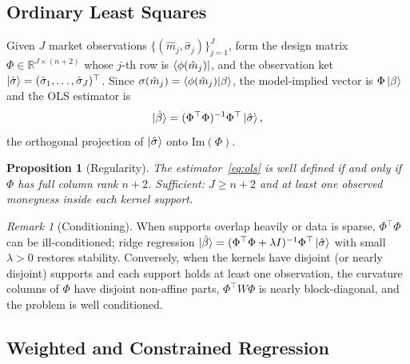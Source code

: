 \documentclass[11pt]{book}
\theoremstyle{plain}
\newtheorem{proposition}[theorem]{Proposition}
\theoremstyle{definition}
\theoremstyle{remark}
\newtheorem{remark}[theorem]{Remark}
\newcommand{\ket}[1]{\mathinner{\lvert #1 \rangle}}
\newcommand{\bra}[1]{\mathinner{\langle #1 \rvert}}
\newcommand{\braket}[1]{\mathinner{\langle #1 \rangle}}
\newcommand{\parket}{\ket{\beta}}                %
\begin{document}
\subsection{Ordinary Least Squares}
\label{sec:ols}

Given $J$ market observations $\{(\hat m_j, \hat\sigma_j)\}_{j=1}^{J}$, form the
design matrix $\Phi \in \mathbb{R}^{J\times(n+2)}$ whose $j$-th row is
$\bra{\phi(\hat m_j)}$, and the observation ket
$\ket{\hat\sigma} = (\hat\sigma_1,\ldots,\hat\sigma_J)^\top$. Since
$\sigma(\hat m_j) = \braket{\phi(\hat m_j)|\beta}$, the model-implied vector is
$\Phi\parket$ and the OLS estimator is
\begin{equation}\label{eq:ols}
\ket{\hat\beta} = (\Phi^\top\Phi)^{-1}\Phi^\top\ket{\hat\sigma},
\end{equation}
the orthogonal projection of $\ket{\hat\sigma}$ onto $\mathrm{Im}(\Phi)$.

\begin{proposition}[Regularity]\label{prop:ols-regularity}
The estimator~\eqref{eq:ols} is well defined if and only if $\Phi$ has full
column rank $n+2$. Sufficient: $J \ge n+2$ and at least one observed moneyness
inside each kernel support.
\end{proposition}

\begin{remark}[Conditioning]\label{rem:conditioning}
When supports overlap heavily or data is sparse, $\Phi^\top\Phi$ can be
ill-conditioned; ridge regression
$\ket{\hat\beta} = (\Phi^\top\Phi + \lambda I)^{-1}\Phi^\top\ket{\hat\sigma}$
with small $\lambda > 0$ restores stability. Conversely, when the kernels have
disjoint (or nearly disjoint) supports and each support holds at least one
observation, the curvature columns of $\Phi$ have disjoint non-affine parts,
$\Phi^\top W\Phi$ is nearly block-diagonal, and the problem is well
conditioned.
\end{remark}

\subsection{Weighted and Constrained Regression}
\label{sec:wls}
\end{document}
